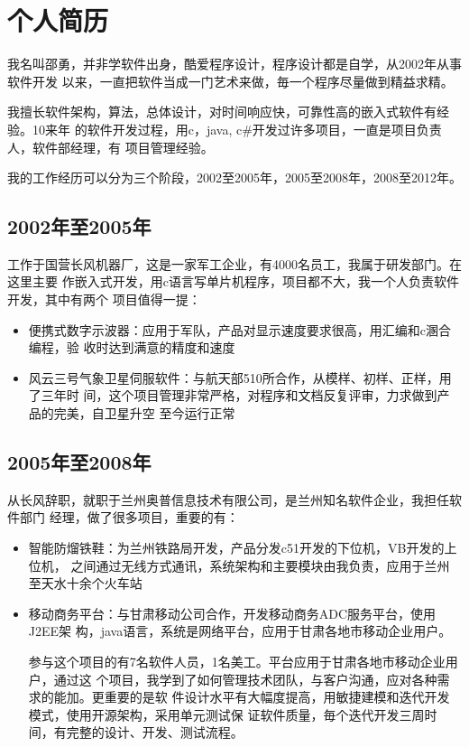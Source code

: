 

\section{个人简历}

我名叫邵勇，并非学软件出身，酷爱程序设计，程序设计都是自学，从2002年从事软件开发
以来，一直把软件当成一门艺术来做，毎一个程序尽量做到精益求精。

我擅长软件架构，算法，总体设计，对时间响应快，可靠性高的嵌入式软件有经验。10来年
的软件开发过程，用c，java, c\#开发过许多项目，一直是项目负责人，软件部经理，有
项目管理经验。

我的工作经历可以分为三个阶段，2002至2005年，2005至2008年，2008至2012年。

\subsection{2002年至2005年}

工作于国营长风机器厂，这是一家军工企业，有4000名员工，我属于研发部门。在这里主要
作嵌入式开发，用c语言写单片机程序，项目都不大，我一个人负责软件开发，其中有两个
项目值得一提：
\begin{itemize}
\item 便携式数字示波器：应用于军队，产品对显示速度要求很高，用汇编和c溷合编程，验
  收时达到满意的精度和速度
\item 风云三号气象卫星伺服软件：与航天部510所合作，从模样、初样、正样，用了三年时
  间，这个项目管理非常严格，对程序和文档反复评审，力求做到产品的完美，自卫星升空
  至今运行正常
\end{itemize}

\subsection{2005年至2008年}

从长风辞职，就职于兰州奥普信息技术有限公司，是兰州知名软件企业，我担任软件部门
经理，做了很多项目，重要的有：
\begin{itemize}
\item 智能防熘铁鞋：为兰州铁路局开发，产品分发c51开发的下位机，VB开发的上位机，
  之间通过无线方式通讯，系统架构和主要模块由我负责，应用于兰州至天水十余个火车站
\item 移动商务平台：与甘肃移动公司合作，开发移动商务ADC服务平台，使用J2EE架
  构，java语言，系统是网络平台，应用于甘肃各地市移动企业用户。

  参与这个项目的有7名软件人员，1名美工。平台应用于甘肃各地市移动企业用户，通过这
  个项目，我学到了如何管理技术团队，与客户沟通，应对各种需求的能加。更重要的是软
  件设计水平有大幅度提高，用敏捷建模和迭代开发模式，使用开源架构，采用单元测试保
  证软件质量，毎个迭代开发三周时间，有完整的设计、开发、测试流程。
\end{itemize}

